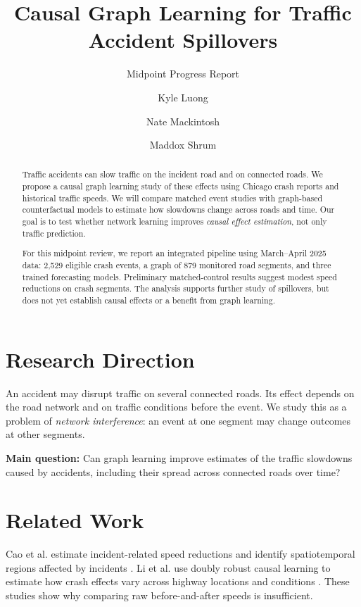 \documentclass[sigconf,nonacm]{acmart}
\title[Traffic Accident Spillovers]{Causal Graph Learning for Traffic Accident Spillovers}
\subtitle{{Midpoint Progress Report}}
\author{Kyle Luong}
\affiliation{\institution{University of Virginia}\city{Charlottesville}\state{Virginia}\country{USA}}
\author{Nate Mackintosh}
\affiliation{\institution{University of Virginia}\city{Charlottesville}\state{Virginia}\country{USA}}
\author{Maddox Shrum}
\affiliation{\institution{University of Virginia}\city{Charlottesville}\state{Virginia}\country{USA}}
\begin{document}
\begin{abstract}
Traffic accidents can slow traffic on the incident road and on connected
roads. We propose a causal graph learning study of these effects using
Chicago crash reports and historical traffic speeds. We will compare
matched event studies with graph-based counterfactual models to estimate
how slowdowns change across roads and time. Our goal is to test whether
network learning improves \emph{causal effect estimation}, not only
traffic prediction.

{For this midpoint review, we report an integrated
pipeline using March--April 2025 data: 2{,}529 eligible crash events,
a graph of 879 monitored road segments, and three trained forecasting
models. Preliminary matched-control results suggest modest speed
reductions on crash segments. The analysis supports further study of
spillovers, but does not yet establish causal effects or a benefit
from graph learning.}
\end{abstract}

\maketitle

\section{Research Direction}
An accident may disrupt traffic on several connected roads. Its effect
depends on the road network and on traffic conditions before the event.
We study this as a problem of \emph{network interference}: an event at
one segment may change outcomes at other segments.

\noindent\textbf{Main question:} Can graph learning improve estimates
of the traffic slowdowns caused by accidents, including their spread
across connected roads over time?

\section{Related Work}
Cao et al. estimate incident-related speed reductions and identify
spatiotemporal regions affected by incidents \cite{cao2021traffic}.
Li et al. use doubly robust causal learning to estimate how crash
effects vary across highway locations and conditions
\cite{li2024crash}. These studies show why comparing raw before-and-after
speeds is insufficient.
\end{document}
